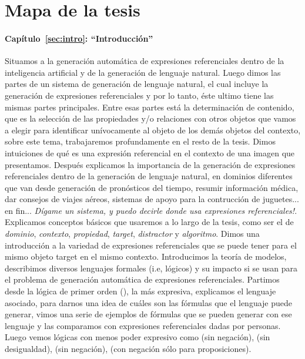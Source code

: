 \section{Mapa de la tesis}
\label{sec:mapadetesis}
\paragraph{Cap\'itulo~\ref{sec:intro}: ``Introducci\'on''} Situamos a la generaci\'on autom\'atica de expresiones 
referenciales dentro de la inteligencia artificial y de la generaci\'on de lenguaje natural. Luego dimos las partes de un sistema de 
generaci\'on de lenguaje natural, el cual incluye la generaci\'on de expresiones referenciales y por lo tanto, \'este ultimo tiene las mismas 
partes principales. Entre esas partes est\'a la determinaci\'on de contenido, que es la selecci\'on de las propiedades y/o relaciones con otros objetos que vamos a elegir 
para identificar un\'ivocamente al objeto de los dem\'as objetos del contexto, sobre este tema, trabajaremos profundamente en el resto de la 
tesis. Dimos intuiciones de qu\'e es una expresi\'on referencial en el contexto de una imagen que presentamos. Despu\'es explicamos la 
importancia de la generaci\'on de expresiones referenciales dentro de la generaci\'on de lenguaje natural, en 
dominios diferentes que van desde generaci\'on de pron\'osticos del tiempo, resumir informaci\'on m\'edica, dar consejos de viajes a\'ereos, 
sistemas de apoyo para la contrucci\'on de juguetes... en fin... {\it D\'igame un sistema, y puedo decirle donde usa expresiones 
referenciales!}. Explicamos conceptos b\'asicos que usaremos a lo largo de la tesis, como ser el de {\it dominio}, {\it contexto}, 
{\it propiedad}, {\it target}, {\it distractor} y {\it algoritmo}. Dimos una introducci\'on a la variedad de expresiones referenciales que 
se puede tener para el mismo objeto target en el mismo contexto.
Introducimos la teor\'ia de modelos, describimos diversos lenguajes formales (i.e, l\'ogicos) y su impacto si se usan para el problema de generaci\'on autom\'atica de expresiones referenciales.  Partimos desde la l\'ogica de primer orden (\FOL), la m\'as expresiva, explicamos el lenguaje asociado, para darnos una idea de cu\'ales son las f\'ormulas que el lenguaje puede generar, vimos una serie de ejemplos de f\'ormulas que se pueden generar con ese lenguaje y las comparamos con expresiones referenciales dadas por personas. Luego vemos l\'ogicas con menos poder expresivo como \EPFOL (\FOL sin negaci\'on), \ALC (\FOL sin desigualdad), \EL(\ALC sin negaci\'on), \ELAN (\ALC con negaci\'on s\'olo para proposiciones).

